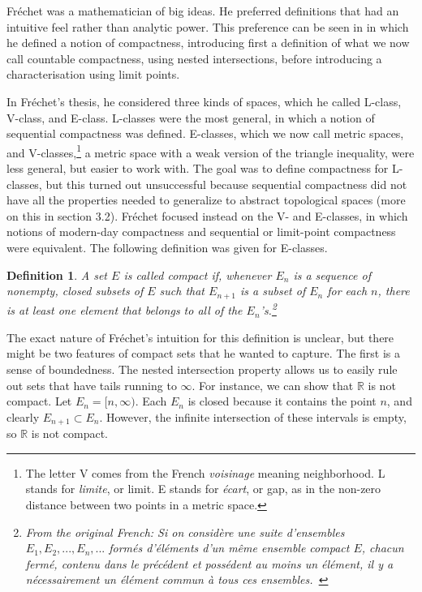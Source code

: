 \documentclass[12pt]{article}
\newtheorem{dfn}[thm]{Definition}
\begin{document}
Fr\'{e}chet was a mathematician of big ideas. He preferred definitions that had an
intuitive feel rather than analytic power. This preference can be seen in \cite[p. 849]{fre1} in which he defined a notion of compactness, introducing first a definition of what we now call countable compactness, using nested intersections, before introducing a characterisation
using limit points. 

In Fr\'{e}chet's thesis, he considered three kinds of spaces, which he called L-class,
V-class, and E-class. L-classes were the most general, in which a notion of sequential
compactness was defined.  E-classes, which we now call metric spaces, and V-classes,\footnote{The letter V comes from the French {\em voisinage} meaning neighborhood. L stands for  {\em limite}, or limit.  E stands for {\em \'{e}cart}, or gap, as in the non-zero distance between two points in a metric space.} a metric space with a weak version of the triangle inequality, were less general, but easier to work with. The goal was to define compactness for L-classes, but this turned out unsuccessful because sequential compactness did not have all the properties needed to generalize to abstract topological spaces (more on this in section 3.2). Fr\'{e}chet focused instead on the V- and E-classes, in which notions of modern-day compactness and sequential or limit-point compactness were equivalent. The following definition was given for E-classes.

\begin{dfn}
A set $E$ is called compact if, whenever ${E_n}$ is a sequence of nonempty, closed
subsets of $E$ such that $E_{n + 1}$ is a subset of ${E_n}$ for each $n$, there is at least
one element that belongs to all of the $E_n$'s.\footnote{From the original French:
Si on consid\`{e}re une suite d'ensembles $E_1, E_2, ..., E_n, ...$ form\'{e}s d'\'{e}l\'{e}ments d'un m\^{e}me ensemble compact $E$, chacun ferm\'{e}, contenu dans le pr\'{e}c\'{e}dent et poss\'{e}dent au moins un \'{e}l\'{e}ment, il y a n\'{e}cessairement un \'{e}l\'{e}ment commun \`{a} tous ces ensembles.~\cite[p.7]{fre2}}
\end{dfn}

The exact nature of Fr\'{e}chet's intuition for this definition is unclear, but there might be two features of compact sets that he wanted to capture.  The first is a sense of boundedness. The nested intersection property allows us to easily rule out sets that have tails running to $\infty$. For instance, we can show that $\mathbb{R}$ is not
compact. Let $E_n=[n,\infty)$. Each $E_n$ is closed because it contains the point $n$, and
clearly $E_{n+1} \subset E_n$. However, the infinite intersection of these intervals is
empty, so $\mathbb{R}$ is not compact. 
\end{document}
